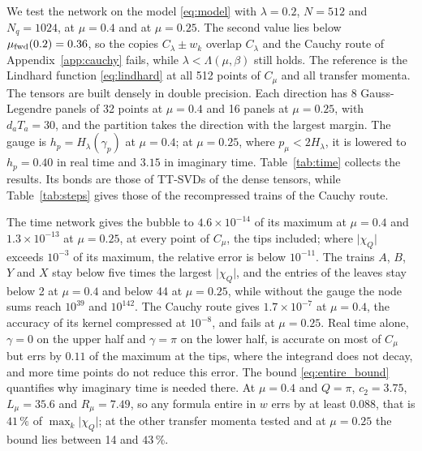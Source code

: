 \documentclass[aps,prb,reprint,a4paper]{revtex4-2}
\begin{document}
We test the network on the model \eqref{eq:model} with $\lambda=0.2$, $N=512$ and $N_q=1024$, at $\mu=0.4$ and at $\mu=0.25$. The second value lies below $\mu_{\rm fwd}(0.2)=0.36$, so the copies $C_\lambda\pm w_k$ overlap $C_\lambda$ and the Cauchy route of Appendix~\ref{app:cauchy} fails, while $\lambda<\Lambda(\mu,\beta)$ still holds. The reference is the Lindhard function \eqref{eq:lindhard} at all 512 points of $C_\mu$ and all transfer momenta. The tensors are built densely in double precision. Each direction has 8 Gauss-Legendre panels of 32 points at $\mu=0.4$ and 16 panels at $\mu=0.25$, with $d_aT_a=30$, and the partition takes the direction with the largest margin. The gauge is $h_p=H_\lambda(\gamma_p)$ at $\mu=0.4$; at $\mu=0.25$, where $p_\mu<2H_\lambda$, it is lowered to $h_p=0.40$ in real time and $3.15$ in imaginary time. Table~\ref{tab:time} collects the results. Its bonds are those of TT-SVDs of the dense tensors, while Table~\ref{tab:steps} gives those of the recompressed trains of the Cauchy route.

The time network gives the bubble to $4.6\times10^{-14}$ of its maximum at $\mu=0.4$ and $1.3\times10^{-13}$ at $\mu=0.25$, at every point of $C_\mu$, the tips included; where $\lvert\chi_Q\rvert$ exceeds $10^{-3}$ of its maximum, the relative error is below $10^{-11}$. The trains $A$, $B$, $Y$ and $X$ stay below five times the largest $\lvert\chi_Q\rvert$, and the entries of the leaves stay below 2 at $\mu=0.4$ and below 44 at $\mu=0.25$, while without the gauge the node sums reach $10^{39}$ and $10^{142}$. The Cauchy route gives $1.7\times10^{-7}$ at $\mu=0.4$, the accuracy of its kernel compressed at $10^{-8}$, and fails at $\mu=0.25$. Real time alone, $\gamma=0$ on the upper half and $\gamma=\pi$ on the lower half, is accurate on most of $C_\mu$ but errs by $0.11$ of the maximum at the tips, where the integrand does not decay, and more time points do not reduce this error. The bound \eqref{eq:entire_bound} quantifies why imaginary time is needed there. At $\mu=0.4$ and $Q=\pi$, $c_2=3.75$, $L_\mu=35.6$ and $R_\mu=7.49$, so any formula entire in $w$ errs by at least $0.088$, that is $41\,\%$ of $\max_k\lvert\chi_Q\rvert$; at the other transfer momenta tested and at $\mu=0.25$ the bound lies between 14 and $43\,\%$.
\end{document}
